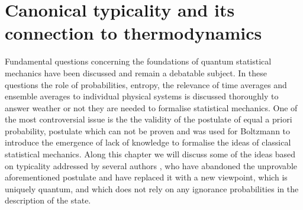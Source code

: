 \chapter{Canonical typicality and its connection to thermodynamics}
Fundamental questions concerning the foundations of quantum statistical mechanics have been discussed and remain a debatable subject\cite{singh_foundations_2013}. In these questions the role of probabilities, entropy, the relevance of time averages and ensemble averages to individual physical systems is discussed thoroughly \cite{gemmer_quantum_2004} to answer weather or not they are needed to formalise statistical mechanics. One of the most controversial issue is the  the validity of the postulate of equal a priori probability, postulate which can not be proven\cite{singh_foundations_2013} and was used for Boltzmann \cite{boltzmann1866mechanische} to introduce the emergence of lack of knowledge to formalise the ideas of classical statistical mechanics. Along this chapter we will discuss some of the ideas based on typicality addressed by several authors \cite{gemmer_quantum_2004, goldstein_canonical_2006, popescu_entanglement_2006}, who have abandoned the unprovable aforementioned postulate and have replaced it with a new viewpoint, which is uniquely quantum, and which does not rely on any ignorance probabilities in the description of the state.\\




